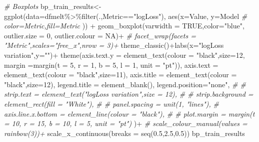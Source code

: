 \documentclass[
]{article}
\newenvironment{Shaded}{\begin{snugshade}}{\end{snugshade}}
\newcommand{\AttributeTok}[1]{\textcolor[rgb]{0.77,0.63,0.00}{#1}}
\newcommand{\CommentTok}[1]{\textcolor[rgb]{0.56,0.35,0.01}{\textit{#1}}}
\newcommand{\ConstantTok}[1]{\textcolor[rgb]{0.00,0.00,0.00}{#1}}
\newcommand{\DecValTok}[1]{\textcolor[rgb]{0.00,0.00,0.81}{#1}}
\newcommand{\FloatTok}[1]{\textcolor[rgb]{0.00,0.00,0.81}{#1}}
\newcommand{\FunctionTok}[1]{\textcolor[rgb]{0.00,0.00,0.00}{#1}}
\newcommand{\NormalTok}[1]{#1}
\newcommand{\OtherTok}[1]{\textcolor[rgb]{0.56,0.35,0.01}{#1}}
\newcommand{\SpecialCharTok}[1]{\textcolor[rgb]{0.00,0.00,0.00}{#1}}
\newcommand{\StringTok}[1]{\textcolor[rgb]{0.31,0.60,0.02}{#1}}
\begin{document}
\begin{Shaded}
\begin{Highlighting}[]
\CommentTok{\# Boxplots}
\NormalTok{bp\_train\_results}\OtherTok{\textless{}{-}}\FunctionTok{ggplot}\NormalTok{(}\AttributeTok{data=}\NormalTok{dfmelt}\SpecialCharTok{\%\textgreater{}\%}\FunctionTok{filter}\NormalTok{(.,Metric}\SpecialCharTok{==}\StringTok{"logLoss"}\NormalTok{),}
                         \FunctionTok{aes}\NormalTok{(}\AttributeTok{x=}\NormalTok{Value, }\AttributeTok{y=}\NormalTok{Model}
                             \CommentTok{\# color=Metric,fill=Metric}
\NormalTok{                             )) }\SpecialCharTok{+}
  \FunctionTok{geom\_boxplot}\NormalTok{(}\AttributeTok{varwidth =} \ConstantTok{TRUE}\NormalTok{,}\AttributeTok{color=}\StringTok{"blue"}\NormalTok{,}
               \AttributeTok{outlier.size =} \DecValTok{0}\NormalTok{,}
               \AttributeTok{outlier.colour =} \ConstantTok{NA}\NormalTok{)}\SpecialCharTok{+}
  \CommentTok{\# facet\_wrap(facets = "Metric",scales="free\_x",nrow = 3)+}
  \FunctionTok{theme\_classic}\NormalTok{()}\SpecialCharTok{+}\FunctionTok{labs}\NormalTok{(}\AttributeTok{x=}\StringTok{"logLoss variation"}\NormalTok{,}\AttributeTok{y=}\StringTok{""}\NormalTok{)}\SpecialCharTok{+}
  \FunctionTok{theme}\NormalTok{(}\AttributeTok{axis.text.y =} \FunctionTok{element\_text}\NormalTok{(}\AttributeTok{colour =} \StringTok{"black"}\NormalTok{,}\AttributeTok{size=}\DecValTok{12}\NormalTok{,}
                                   \AttributeTok{margin =}\FunctionTok{margin}\NormalTok{(}\AttributeTok{t =} \DecValTok{5}\NormalTok{, }\AttributeTok{r =} \DecValTok{1}\NormalTok{, }\AttributeTok{b =} \DecValTok{5}\NormalTok{, }\AttributeTok{l =} \DecValTok{1}\NormalTok{,}
                                                  \AttributeTok{unit =} \StringTok{"pt"}\NormalTok{)),}
                \AttributeTok{axis.text =} \FunctionTok{element\_text}\NormalTok{(}\AttributeTok{colour =} \StringTok{"black"}\NormalTok{,}\AttributeTok{size=}\DecValTok{11}\NormalTok{),}
        \AttributeTok{axis.title =} \FunctionTok{element\_text}\NormalTok{(}\AttributeTok{colour =} \StringTok{"black"}\NormalTok{,}\AttributeTok{size=}\DecValTok{12}\NormalTok{),}
        \AttributeTok{legend.title =} \FunctionTok{element\_blank}\NormalTok{(),}
        \AttributeTok{legend.position=}\StringTok{"none"}\NormalTok{,}
        \CommentTok{\# \# strip.text = element\_text("logLoss variation",size = 12),}
        \CommentTok{\# \# strip.background = element\_rect(fill = "White"),}
        \CommentTok{\# \# panel.spacing = unit(1, "lines"),}
        \CommentTok{\# axis.line.x.bottom = element\_line(colour = "black"),}
        \CommentTok{\# \# plot.margin = margin(t = 10, r = 15, b = 10, l = 5, unit = "pt")}
\NormalTok{        )}\SpecialCharTok{+}
  \CommentTok{\# scale\_colour\_manual(values = rainbow(3))+}
  \FunctionTok{scale\_x\_continuous}\NormalTok{(}\AttributeTok{breaks =} \FunctionTok{seq}\NormalTok{(}\FloatTok{0.5}\NormalTok{,}\FloatTok{2.5}\NormalTok{,}\FloatTok{0.5}\NormalTok{))}
\NormalTok{bp\_train\_results}
\end{Highlighting}
\end{Shaded}
\end{document}
